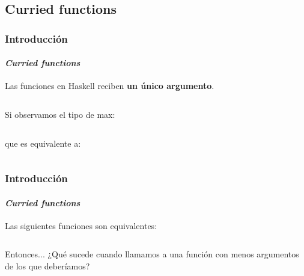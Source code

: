 \subsection{Curried functions}

\begin{frame}[fragile]
  \frametitle{Introducción}
  \framesubtitle{\textit{Curried functions}}
  Las funciones en Haskell reciben \textbf{un único argumento}.

  {\color{white}
    \inputminted[bgcolor=bg]{text}{code/curr00.txt}
  }

  Si observamos el tipo de max:
  {\color{white}
    \inputminted[bgcolor=bg]{haskell}{code/curr01.hs}
  }
  que es equivalente a:
  {\color{white}
    \inputminted[bgcolor=bg]{haskell}{code/curr02.hs}
  }

\end{frame}

\begin{frame}[fragile]
  \frametitle{Introducción} \framesubtitle{\textit{Curried functions}}
  Las siguientes funciones son equivalentes:
  {\color{white}
    \inputminted[bgcolor=bg]{haskell}{code/curr03.hs}
  }
  Entonces... ¿Qué sucede cuando llamamos a una función con menos
  argumentos de los que deberíamos?
  {\color{white}
    \inputminted[bgcolor=bg]{text}{code/curr04.txt}
  }
\end{frame}